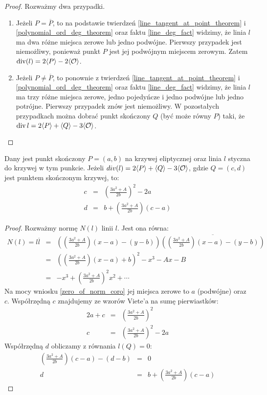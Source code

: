 \begin{proof}
Rozważmy dwa przypadki.
\begin{enumerate}
\item
Jeżeli $P = \overline{P}$,
to na podstawie twierdzeń
\ref{line_tangent_at_point_theorem} i \ref{polynomial_ord_deg_theorem}
oraz faktu \ref{line_deg_fact} widzimy,
że linia $l$ ma dwa różne miejsca zerowe lub jedno podwójne.
Pierwszy przypadek jest niemożliwy,
ponieważ punkt $P$ jest jej podwójnym miejscem zerowym.
Zatem $\operatorname{div}(l) = 2\langle P\rangle - 2\langle\mathcal{O}\rangle$.
\item
Jeżeli $P \neq \overline{P}$,
to ponownie z twierdzeń
\ref{line_tangent_at_point_theorem} i \ref{polynomial_ord_deg_theorem}
oraz faktu \ref{line_deg_fact} widzimy,
że linia $l$ ma trzy różne miejsca zerowe, jedno pojedyńcze i jedno podwójne
lub jedno potrójne.
Pierwszy przypadek znów jest niemożliwy.
W pozostałych przypadkach można dobrać punkt skończony $Q$
(być może równy $P$) taki,
że $\operatorname{div}{l} = 2\langle P\rangle + \langle Q\rangle - 3\langle\mathcal{O}\rangle$.
\end{enumerate}
\end{proof}

\begin{theorem}
Dany jest punkt skończony $P = (a, b)$ na krzywej eliptycznej
oraz linia $l$ styczna do krzywej w tym punkcie.
Jeżeli $div(l) = 2\langle P\rangle + \langle Q\rangle - 3\langle\mathcal{O}\rangle$,
gdzie $Q = (c, d)$ jest punktem skończonym krzywej,
to:
\begin{eqnarray}
\label{tangent_line_third_point_x_eqn}
c & = & \left(\frac{3a^2 + A}{2b}\right)^2 - 2a \\
\label{tangent_line_third_point_y_eqn}
d & = & b + \left(\frac{3a^2 + A}{2b}\right)(c - a)
\end{eqnarray}
\end{theorem}

\begin{proof}
Rozważmy normę $N(l)$ linii $l$. Jest ona równa:
\begin{eqnarray*}
N(l) = l\overline{l}
& = & \left(\left(\frac{3a^2 + A}{2b}\right)(x - a) - (y - b)\right)
      \overline{
      \left(\left(\frac{3a^2 + A}{2b}\right)(x - a) - (y - b)\right)
      } \\
& = & \left(\left(\frac{3a^2+A}{2b}\right)(x-a) + b\right)^2 - x^3 - Ax - B \\
& = & -x^3 + \left(\frac{3a^2+A}{2b}\right)^2x^2 + \cdots
\end{eqnarray*}
Na mocy wniosku \ref{zero_of_norm_coro}
jej miejsca zerowe to $a$ (podwójne) oraz $c$.
Współrzędną $c$ znajdujemy ze wzorów Viete'a na sumę pierwiastków:
\begin{eqnarray*}
2a + c & = & \left(\frac{3a^2+A}{2b}\right)^2 \\
     c & = & \left(\frac{3a^2+A}{2b}\right)^2 - 2a
\end{eqnarray*}
Współrzędną $d$ obliczamy z równania $l(Q) = 0$:
\begin{eqnarray*}
\left(\frac{3a^2 + A}{2b}\right)(c - a) - (d - b) & = & 0 \\
d & = & b + \left(\frac{3a^2 + A}{2b}\right)(c - a)
\end{eqnarray*}
\end{proof}


